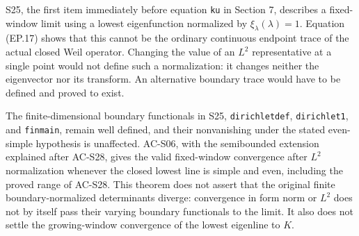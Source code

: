 \begin{remark}
S25, the first item immediately before equation
\texttt{ku} in Section 7, describes a fixed-window limit
using a lowest eigenfunction normalized by
\(\xi_\lambda(\lambda)=1\).
Equation (EP.17) shows that this cannot be the ordinary
continuous endpoint trace of the actual closed Weil
operator.  Changing the value of an \(L^2\) representative
at a single point would not define such a normalization:
it changes neither the eigenvector nor its transform.
An alternative boundary trace would have to be defined
and proved to exist.

The finite-dimensional boundary functionals in S25,
\texttt{dirichletdef}, \texttt{dirichlet1}, and
\texttt{finmain}, remain well defined, and their
nonvanishing under the stated even-simple hypothesis
is unaffected.  AC-S06, with the semibounded extension
explained after AC-S28, gives the valid fixed-window
convergence after \(L^2\) normalization whenever the
closed lowest line is simple and even, including the
proved range of AC-S28.
This theorem does not assert that the original finite
boundary-normalized determinants diverge: convergence
in form norm or \(L^2\) does not by itself pass their
varying boundary functionals to the limit.
It also does not settle the growing-window convergence
of the lowest eigenline to \(K\).
\end{remark}
